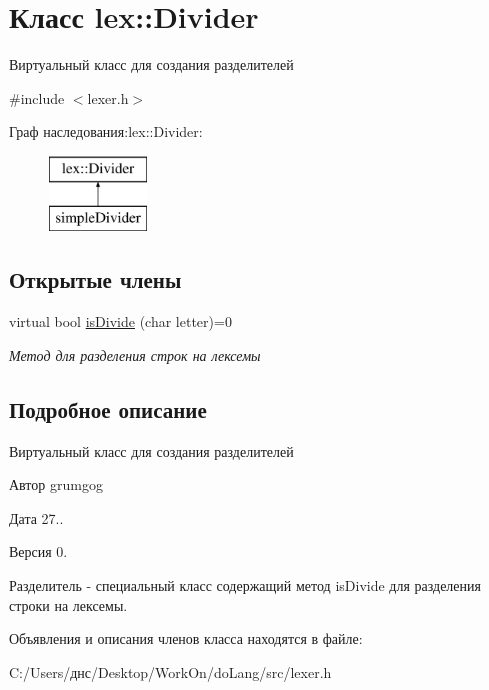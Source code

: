 \hypertarget{classlex_1_1_divider}{}\section{Класс lex\+:\+:Divider}
\label{classlex_1_1_divider}


Виртуальный класс для создания разделителей  




{\ttfamily \#include $<$lexer.\+h$>$}

Граф наследования\+:lex\+:\+:Divider\+:\begin{figure}[H]
\begin{center}
\leavevmode
\includegraphics[height=2.000000cm]{classlex_1_1_divider}
\end{center}
\end{figure}
\subsection*{Открытые члены}
\begin{DoxyCompactItemize}
\item 
\mbox{\label{classlex_1_1_divider_ac8cfe376aa8c0b04219b0512bfb6cb25}} 
virtual bool \hyperlink{classlex_1_1_divider_ac8cfe376aa8c0b04219b0512bfb6cb25}{is\+Divide} (char letter)=0
\begin{DoxyCompactList}\small\item\em Метод для разделения строк на лексемы \end{DoxyCompactList}\end{DoxyCompactItemize}


\subsection{Подробное описание}
Виртуальный класс для создания разделителей 

\begin{DoxyAuthor}{Автор}
grumgog 
\end{DoxyAuthor}
\begin{DoxyDate}{Дата}
27.. 
\end{DoxyDate}
\begin{DoxyVersion}{Версия}
0.
\end{DoxyVersion}
Разделитель -\/ специальный класс содержащий метод is\+Divide для разделения строки на лексемы. 

Объявления и описания членов класса находятся в файле\+:\begin{DoxyCompactItemize}
\item 
C\+:/\+Users/днс/\+Desktop/\+Work\+On/do\+Lang/src/lexer.\+h\end{DoxyCompactItemize}
